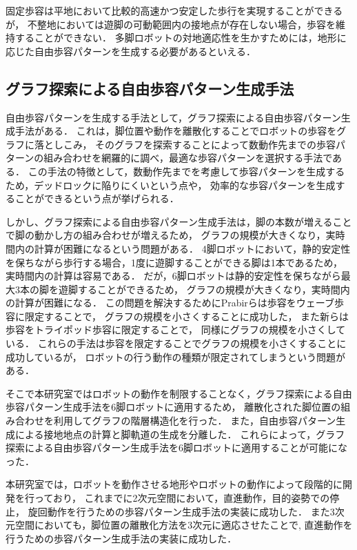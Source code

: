 固定歩容は平地において比較的高速かつ安定した歩行を実現することができるが，
不整地においては遊脚の可動範囲内の接地点が存在しない場合，歩容を維持することができない．
多脚ロボットの対地適応性を生かすためには，地形に応じた自由歩容パターンを生成する必要があるといえる．

\subsection{グラフ探索による自由歩容パターン生成手法}
自由歩容パターンを生成する手法として，グラフ探索による自由歩容パターン生成手法がある．
これは，脚位置や動作を離散化することでロボットの歩容をグラフに落としこみ，
そのグラフを探索することによって数動作先までの歩容パターンの組み合わせを網羅的に調べ，最適な歩容パターンを選択する手法である．
この手法の特徴として，数動作先までを考慮して歩容パターンを生成するため，デッドロックに陥りにくいという点や，
効率的な歩容パターンを生成することができるという点が挙げられる．

しかし、グラフ探索による自由歩容パターン生成手法は，脚の本数が増えることで脚の動かし方の組み合わせが増えるため，
グラフの規模が大きくなり，実時間内の計算が困難になるという問題がある．
4脚ロボットにおいて，静的安定性を保ちながら歩行する場合，1度に遊脚することができる脚は1本であるため，
実時間内の計算は容易である\cite{Prabir_Graph_search}．
だが，6脚ロボットは静的安定性を保ちながら最大3本の脚を遊脚することができるため，
グラフの規模が大きくなり，実時間内の計算が困難になる．
この問題を解決するためにPrabirらは歩容をウェーブ歩容に限定することで，
グラフの規模を小さくすることに成功した\cite{Prabir_Graph_search_Six}，
また新らは歩容をトライポッド歩容に限定することで\cite{Arata_Graph_search_Six}，
同様にグラフの規模を小さくしている．
これらの手法は歩容を限定することでグラフの規模を小さくすることに成功しているが，
ロボットの行う動作の種類が限定されてしまうという問題がある．

そこで本研究室ではロボットの動作を制限することなく，グラフ探索による自由歩容パターン生成手法を6脚ロボットに適用するため，
離散化された脚位置の組み合わせを利用してグラフの階層構造化を行った．
また，自由歩容パターン生成による接地地点の計算と脚軌道の生成を分離した．
これらによって，グラフ探索による自由歩容パターン生成手法を6脚ロボットに適用することが可能になった．

本研究室では，ロボットを動作させる地形やロボットの動作によって段階的に開発を行っており，
これまでに2次元空間において，直進動作\cite{Oki_Graph_search}，目的姿勢での停止\cite{Nakaoka_Graph_search}，
旋回動作\cite{Shina_Graph_search}を行うための歩容パターン生成手法の実装に成功した．
また3次元空間においても，脚位置の離散化方法を3次元に適応させたことで\cite{Miura_Graph_search},
直進動作\cite{Hato_Graph_search}を行うための歩容パターン生成手法の実装に成功した．

